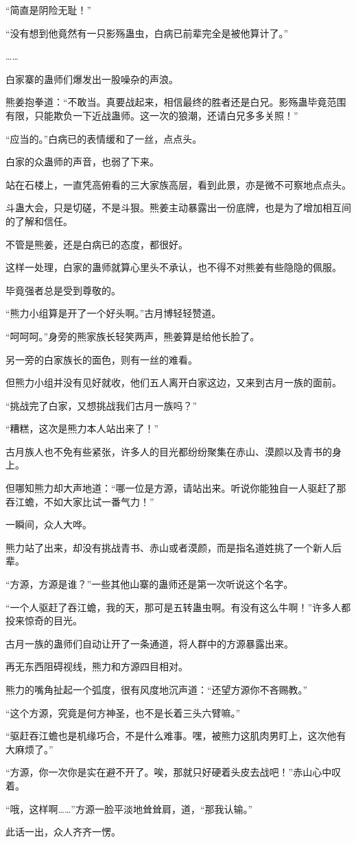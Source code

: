 \begin{this_body}
“简直是阴险无耻！”

“没有想到他竟然有一只影殇蛊虫，白病已前辈完全是被他算计了。”

……

白家寨的蛊师们爆发出一股噪杂的声浪。

熊姜抱拳道：“不敢当。真要战起来，相信最终的胜者还是白兄。影殇蛊毕竟范围有限，只能欺负一下近战蛊师。这一次的狼潮，还请白兄多多关照！”

“应当的。”白病已的表情缓和了一丝，点点头。

白家的众蛊师的声音，也弱了下来。

站在石楼上，一直凭高俯看的三大家族高层，看到此景，亦是微不可察地点点头。

斗蛊大会，只是切磋，不是斗狠。熊姜主动暴露出一份底牌，也是为了增加相互间的了解和信任。

不管是熊姜，还是白病已的态度，都很好。

这样一处理，白家的蛊师就算心里头不承认，也不得不对熊姜有些隐隐的佩服。

毕竟强者总是受到尊敬的。

“熊力小组算是开了一个好头啊。”古月博轻轻赞道。

“呵呵呵。”身旁的熊家族长轻笑两声，熊姜算是给他长脸了。

另一旁的白家族长的面色，则有一丝的难看。

但熊力小组并没有见好就收，他们五人离开白家这边，又来到古月一族的面前。

“挑战完了白家，又想挑战我们古月一族吗？”

“糟糕，这次是熊力本人站出来了！”

古月族人也不免有些紧张，许多人的目光都纷纷聚集在赤山、漠颜以及青书的身上。

但哪知熊力却大声地道：“哪一位是方源，请站出来。听说你能独自一人驱赶了那吞江蟾，不如大家比试一番气力！”

一瞬间，众人大哗。

熊力站了出来，却没有挑战青书、赤山或者漠颜，而是指名道姓挑了一个新人后辈。

“方源，方源是谁？”一些其他山寨的蛊师还是第一次听说这个名字。

“一个人驱赶了吞江蟾，我的天，那可是五转蛊虫啊。有没有这么牛啊！”许多人都投来惊奇的目光。

古月一族的蛊师们自动让开了一条通道，将人群中的方源暴露出来。

再无东西阻碍视线，熊力和方源四目相对。

熊力的嘴角扯起一个弧度，很有风度地沉声道：“还望方源你不吝赐教。”

“这个方源，究竟是何方神圣，也不是长着三头六臂嘛。”

“驱赶吞江蟾也是机缘巧合，不是什么难事。嘿，被熊力这肌肉男盯上，这次他有大麻烦了。”

“方源，你一次你是实在避不开了。唉，那就只好硬着头皮去战吧！”赤山心中叹着。

“哦，这样啊……”方源一脸平淡地耸耸肩，道，“那我认输。”

此话一出，众人齐齐一愣。

\end{this_body}

